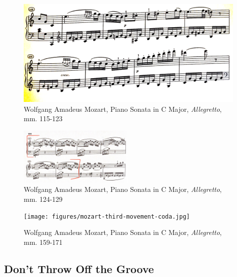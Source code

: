 \begin{figure}
	\centering
	\includegraphics[width=\textwidth]{figures/mozart-third-movement-bars-116-123.jpg}
	\caption{Wolfgang Amadeus Mozart, Piano Sonata in C Major, \textit{Allegretto}, mm. 115-123}
	\label{fig:mozart-third-movement-bars-116-123}
\end{figure}

\begin{figure}
	\centering
	\includegraphics[width=0.5\textwidth]{figures/mozart-third-movement-bars-124-129.jpg}
	\caption{Wolfgang Amadeus Mozart, Piano Sonata in C Major, \textit{Allegretto}, mm. 124-129}
	\label{fig:mozart-third-movement-bars-124-129}
\end{figure}

\begin{figure}
    \centering
    \texttt{[image: figures/mozart-third-movement-coda.jpg]}
    \caption{Wolfgang Amadeus Mozart, Piano Sonata in C Major, \textit{Allegretto}, mm. 159-171}
    \label{fig:mozart-third-movement-coda}
\end{figure}

\subsection{Don't Throw Off the Groove}

